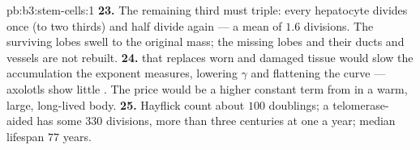 \begin{solution}{pb:b3:stem-cells:1}
\textbf{23.} The remaining third must triple: every hepatocyte divides
once (to two thirds) and half divide again --- a mean of $1.6$ divisions.
The surviving lobes swell to the original mass; the missing lobes and
their ducts and vessels are not rebuilt.
\textbf{24.}  that replaces worn and damaged tissue would
slow the accumulation the exponent measures, lowering $\gamma$ and
flattening the curve --- axolotls show little . The price
would be a higher constant term from  in a warm, large,
long-lived body.
\textbf{25.} Hayflick count about $100$ doublings; a telomerase-aided
 has some $330$ divisions, more than three centuries at one a
year; median lifespan $77$ years.
\end{solution}
